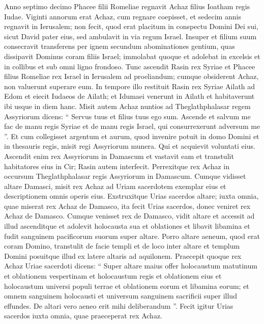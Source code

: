 \begin{biblechapter}
\begin{biblechapter}
\begin{biblechapter}
\begin{biblechapter}
\begin{biblechapter}
\begin{biblechapter}
\begin{biblechapter}
\begin{biblechapter}
\begin{biblechapter}
\begin{biblechapter}
\begin{biblechapter}
\begin{biblechapter}
\begin{biblechapter}
\begin{biblechapter}
\begin{biblechapter}
\begin{biblechapter}
 \verse Anno septimo decimo Phacee filii Romeliae regnavit Achaz filius Ioatham regis Iudae. 
\verse Viginti annorum erat Achaz, cum regnare coepisset, et sedecim annis regnavit in Ierusalem; non fecit, quod erat placitum in conspectu Domini Dei sui, sicut David pater eius, 
\verse sed ambulavit in via regum Israel. Insuper et filium suum consecravit transferens per ignem secundum abominationes gentium, quas dissipavit Dominus coram filiis Israel; 
\verse immolabat quoque et adolebat in excelsis et in collibus et sub omni ligno frondoso.
 \verse Tunc ascendit Rasin rex Syriae et Phacee filius Romeliae rex Israel in Ierusalem ad proeliandum; cumque obsiderent Achaz, non valuerunt superare eum. 
 \verse In tempore illo restituit Rasin rex Syriae Ailath ad Edom et eiecit Iudaeos de Ailath; et Idumaei venerunt in Ailath et habitaverunt ibi usque in diem hanc. 
 \verse Misit autem Achaz nuntios ad Theglathphalasar regem Assyriorum dicens: “ Servus tuus et filius tuus ego sum. Ascende et salvum me fac de manu regis Syriae et de manu regis Israel, qui consurrexerunt adversum me ”. 
\verse Et cum collegisset argentum et aurum, quod invenire potuit in domo Domini et in thesauris regis, misit regi Assyriorum munera. 
\verse Qui et acquievit voluntati eius. Ascendit enim rex Assyriorum in Damascum et vastavit eam et transtulit habitatores eius in Cir; Rasin autem interfecit.
 \verse Perrexitque rex Achaz in occursum Theglathphalasar regis Assyriorum in Damascum. Cumque vidisset altare Damasci, misit rex Achaz ad Uriam sacerdotem exemplar eius et descriptionem omnis operis eius. 
\verse Exstruxitque Urias sacerdos altare; iuxta omnia, quae miserat rex Achaz de Damasco, ita fecit Urias sacerdos, donec veniret rex Achaz de Damasco. 
\verse Cumque venisset rex de Damasco, vidit altare et accessit ad illud ascenditque 
\verse et adolevit holocausta sua et oblationes et libavit libamina et fudit sanguinem pacificorum suorum super altare. 
\verse Porro altare aeneum, quod erat coram Domino, transtulit de facie templi et de loco inter altare et templum Domini posuitque illud ex latere altaris ad aquilonem.
 \verse Praecepit quoque rex Achaz Uriae sacerdoti dicens: “ Super altare maius offer holocaustum matutinum et oblationem vespertinam et holocaustum regis et oblationem eius et holocaustum universi populi terrae et oblationem eorum et libamina eorum; et omnem sanguinem holocausti et universum sanguinem sacrificii super illud effundes. De altari vero aeneo erit mihi deliberandum ”. 
\verse Fecit igitur Urias sacerdos iuxta omnia, quae praeceperat rex Achaz. 

\end{biblechapter}
\end{biblechapter}
\end{biblechapter}
\end{biblechapter}
\end{biblechapter}
\end{biblechapter}
\end{biblechapter}
\end{biblechapter}
\end{biblechapter}
\end{biblechapter}
\end{biblechapter}
\end{biblechapter}
\end{biblechapter}
\end{biblechapter}
\end{biblechapter}
\end{biblechapter}
